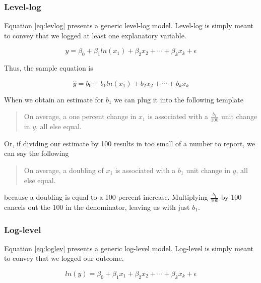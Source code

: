 \documentclass[
]{book}
\begin{document}
\hypertarget{level-log}{%
\subsubsection*{Level-log}\label{level-log}}

Equation \eqref{eq:levlog} presents a generic level-log model. Level-log is simply meant to convey that we logged at least one explanatory variable.

\begin{equation}
y=\beta_0 + \beta_1ln(x_1) + \beta_2x_2 + \cdots + \beta_kx_k + \epsilon
\label{eq:levlog}
\end{equation}

Thus, the sample equation is

\begin{equation}
\hat{y}=b_0 + b_1ln(x_1) + b_2x_2 + \cdots + b_kx_k
\label{eq:levlogsamp}
\end{equation}

When we obtain an estimate for \(b_1\) we can plug it into the following template

\begin{quote}
On average, a one percent change in \(x_1\) is associated with a \(\frac{b_1}{100}\) unit change in \(y\), all else equal.
\end{quote}

Or, if dividing our estimate by 100 results in too small of a number to report, we can say the following

\begin{quote}
On average, a doubling of \(x_1\) is associated with a \(b_1\) unit change in \(y\), all else equal.
\end{quote}

because a doubling is equal to a 100 percent increase. Multiplying \(\frac{b_1}{100}\) by 100 cancels out the 100 in the denominator, leaving us with just \(b_1\).

\hypertarget{log-level}{%
\subsubsection*{Log-level}\label{log-level}}

Equation \eqref{eq:loglev} presents a generic log-level model. Log-level is simply meant to convey that we logged our outcome.

\begin{equation}
ln(y)=\beta_0 + \beta_1x_1 + \beta_2x_2 + \cdots + \beta_kx_k + \epsilon
\label{eq:loglev}
\end{equation}
\end{document}

